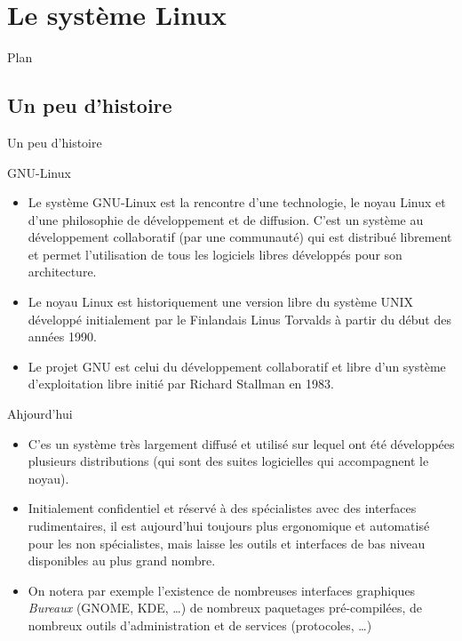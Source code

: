 \section{Le système Linux}
\label{sec:OSLinux}
\begin{frame}{Plan}
  \tableofcontents[hideothersubsections,sections={1-4}]
\end{frame}
\subsection{Un peu d'histoire}
\begin{frame}{Un peu d'histoire}
  \begin{block}{GNU-Linux}
    \begin{itemize}
    \item Le système GNU-Linux est la rencontre d'une technologie, le noyau Linux et d'une  philosophie de développement et de diffusion. C'est un système au développement collaboratif (par une communauté) qui est distribué librement et permet l'utilisation de tous les logiciels libres développés pour son architecture.
    \item Le noyau Linux est historiquement une version libre du système UNIX développé initialement par le Finlandais Linus Torvalds à partir du début des années 1990.
    \item Le projet GNU est celui du développement collaboratif et libre d'un système d'exploitation libre initié par Richard Stallman en 1983.
    \end{itemize}
  \end{block}
  \begin{block}{Ahjourd'hui}
    \begin{itemize}
    \item C'es un système très largement diffusé et utilisé sur lequel ont été développées plusieurs distributions (qui sont des suites logicielles qui accompagnent le noyau).
    \item Initialement confidentiel et réservé à des spécialistes avec des interfaces rudimentaires, il est aujourd'hui toujours plus ergonomique et automatisé pour les non spécialistes, mais laisse les outils et interfaces de bas niveau disponibles au plus grand nombre.
    \item On notera par exemple l'existence de nombreuses interfaces graphiques \textit{Bureaux} (GNOME, KDE, \dots) de nombreux paquetages pré-compilées, de nombreux outils d'administration et de services (protocoles, \dots)
    \end{itemize}
  \end{block}
  
\end{frame}
